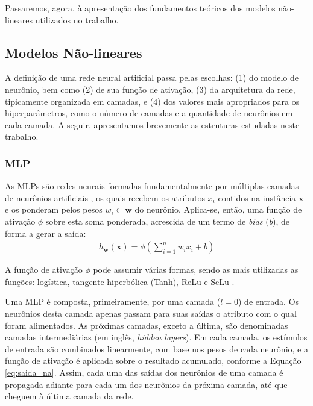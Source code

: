 \documentclass[a4paper]{article}
\begin{document}
\begin{multicols}{2}
    Passaremos, agora, à apresentação dos fundamentos teóricos dos modelos não-lineares utilizados no trabalho.
    
\subsection{Modelos Não-lineares}

    A definição de uma rede neural artificial passa pelas escolhas: (1) do modelo de neurônio, bem como (2) de sua função de ativação, (3) da arquitetura da rede, tipicamente organizada em camadas, e (4) dos valores mais apropriados para os hiperparâmetros, como o número de camadas e a quantidade de neurônios em cada camada. A seguir, apresentamos brevemente as estruturas estudadas neste trabalho. 
    
\subsubsection{MLP}
\label{subsubsec:mlp_descricao}
    
    As MLPs são redes neurais formadas fundamentalmente por múltiplas camadas de neurônios artificiais \cite{Geron}, os quais recebem os atributos $x_i$ contidos na instância $\mathbf{x}$ e os ponderam pelos pesos $w_i \subset \mathbf{w}$ do neurônio. Aplica-se, então, uma função de ativação $\phi$ sobre esta soma ponderada, acrescida de um termo de \textit{bias} (\textit{b}), de forma a gerar a saída:
\begin{equation}
\begin{aligned}
h_{\mathbf{w}}(\mathbf{x}) = \phi\left(\sum_{i=1}^{n}w_ix_i + b\right)
\end{aligned}
\label{eq:saida_na}
\end{equation} 

    A função de ativação $\phi$ pode assumir várias formas, sendo as mais utilizadas as funções: logística, tangente hiperbólica (Tanh), ReLu e SeLu \cite{Geron}.

    Uma MLP é composta, primeiramente, por uma camada ($l = 0$) de entrada. Os neurônios desta camada apenas passam para suas saídas o  atributo com o qual foram alimentados. As próximas camadas, exceto a última, são denominadas camadas intermediárias (em inglês, \emph{hidden layers}). Em cada camada, os estímulos de entrada são combinados linearmente, com base nos pesos de cada neurônio, e a função de ativação é aplicada sobre o resultado acumulado, conforme a Equação \eqref{eq:saida_na}. Assim, cada uma das saídas dos neurônios de uma camada é propagada adiante para cada um dos neurônios da próxima camada, até que cheguem à última camada da rede. 
    

\end{multicols}
\end{document}
